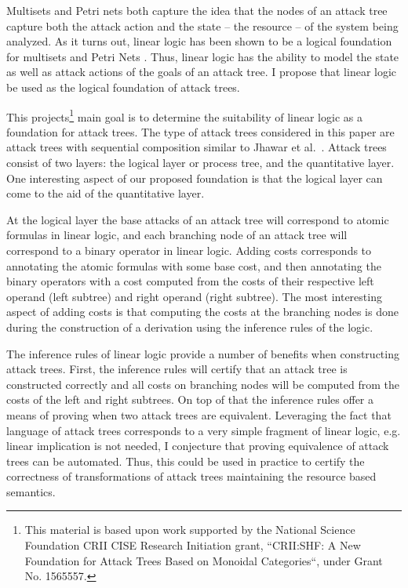 \documentclass{llncs}
\begin{document}
Multisets and Petri nets both capture the idea that the nodes of an
attack tree capture both the attack action and the state -- the
resource -- of the system being analyzed. As it turns out, linear
logic has been shown to be a logical foundation for multisets
\cite{Tzouvaras:1998} and Petri Nets \cite{Brown:1991}.  Thus, linear
logic has the ability to model the state as well as attack actions of
the goals of an attack tree.  I propose that linear logic be used as
the logical foundation of attack trees.

This projects\footnote{This material is based upon work supported by
  the National Science Foundation CRII CISE Research Initiation grant,
  ``CRII:SHF: A New Foundation for Attack Trees Based on Monoidal
  Categories``, under Grant No. 1565557.} main goal is to determine
the suitability of linear logic as a foundation for attack trees.  The
type of attack trees considered in this paper are attack trees with
sequential composition similar to Jhawar et al.~\cite{Jhawar:2015}.
Attack trees consist of two layers: the logical layer or process tree,
and the quantitative layer.  One interesting aspect of our proposed
foundation is that the logical layer can come to the aid of the
quantitative layer.

At the logical layer the base attacks of an attack tree will
correspond to atomic formulas in linear logic, and each branching node
of an attack tree will correspond to a binary operator in linear
logic.  Adding costs corresponds to annotating the atomic formulas
with some base cost, and then annotating the binary operators with a
cost computed from the costs of their respective left operand (left
subtree) and right operand (right subtree).  The most interesting
aspect of adding costs is that computing the costs at the branching
nodes is done during the construction of a derivation using the
inference rules of the logic.

The inference rules of linear logic provide a number of benefits when
constructing attack trees.  First, the inference rules will certify
that an attack tree is constructed correctly and all costs on
branching nodes will be computed from the costs of the left and right
subtrees.  On top of that the inference rules offer a means of proving
when two attack trees are equivalent. Leveraging the fact that
language of attack trees corresponds to a very simple fragment of
linear logic, e.g. linear implication is not needed, I conjecture
that proving equivalence of attack trees can be automated.  Thus, this
could be used in practice to certify the correctness of
transformations of attack trees maintaining the resource based
semantics.
\end{document}
